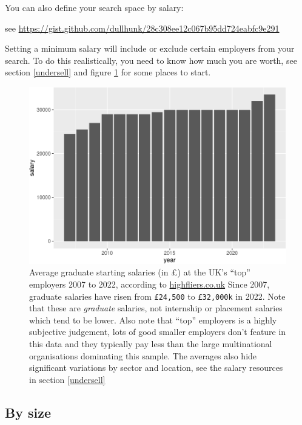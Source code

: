 \documentclass[
]{book}
\begin{document}
You can also define your search space by salary:

see \url{https://gist.github.com/dullhunk/28c308ee12c067b95dd724eabfc9e291}

Setting a minimum salary will include or exclude certain employers from your search. To do this realistically, you need to know how much you are worth, see section \ref{undersell} and figure \ref{fig:salaries-fig} for some places to start.

\begin{figure}

{\centering \includegraphics[width=1\linewidth]{cdyf_files/figure-latex/salaries-fig-1} 

}

\caption{Average graduate starting salaries (in £) at the UK's ``top'' employers 2007 to 2022, according to \href{https://www.highfliers.co.uk}{highfliers.co.uk} \citep{highfliers2022} Since 2007, graduate salaries have risen from \texttt{£24,500} to \texttt{£32,000k} in 2022. Note that these are \emph{graduate} salaries, not internship or placement salaries which tend to be lower. Also note that ``top'' employers is a highly subjective judgement, lots of good smaller employers don't feature in this data and they typically pay less than the large multinational organisations dominating this sample. The averages also hide significant variations by sector and location, see the salary resources in section \ref{undersell}}\label{fig:salaries-fig}
\end{figure}



\hypertarget{by-size}{%
\subsection{By size}\label{by-size}}
\end{document}
